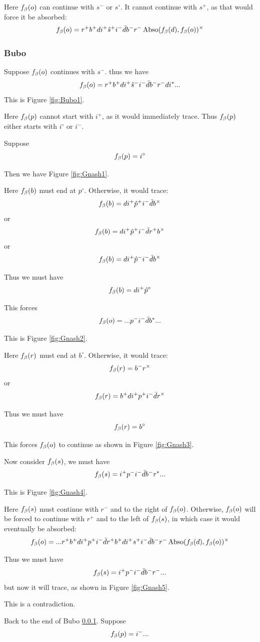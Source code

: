 Here $f_\beta(o)$ can continue with $s^-$ or $s^\circ$. It cannot continue with $s^+$, as that would force it be absorbed:
\[
f_\beta(o) = r^+ b^+ d i^+ \hat{s}^+ i^- \bar{d} b^- r^- \operatorname{Abso}(f_\beta(d), f_\beta(o))^\times
\]

\subsubsection{Bubo}\label{Bubo}
Suppose $f_\beta(o)$ continues with $s^-$. thus we have
\[
f_\beta(o) = r^+ b^+ d i^+ \hat{s}^- i^- \bar{d} b^- r^- d i^*...
\]
This is Figure \ref{fig:Bubo1}.

Here $f_\beta(p)$ cannot start with $i^+$, as it would immediately trace. Thus $f_\beta(p)$ either starts with $i^\circ$ or $i^-$.

\label{Gnash}
Suppose
\[
f_\beta(p) = i^\circ
\]

Then we have Figure \ref{fig:Gnash1}.

Here $f_\beta(b)$ must end at $p^\circ$. Otherwise, it would trace:
\[
f_\beta(b) = d i^+ \hat{p}^+ i^- \bar{d} b^\times
\]
or
\[
f_\beta(b) = d i^+ \hat{p}^+ i^- \bar{d} r^+ b^\times
\]
or
\[
f_\beta(b) = d i^+ \hat{p}^-i^- \bar{d} b^\times
\]

Thus we must have
\[
f_\beta(b) = d i^+ \hat{p}^\circ
\]

This forces
\[
f_\beta(o) = ...p^- i^- \bar{d} b^*...
\]

This is Figure \ref{fig:Gnash2}.

Here $f_\beta(r)$ must end at $b^\circ$. Otherwise, it would trace:
\[
f_\beta(r) = b^- r^\times
\]
or
\[
f_\beta(r) = b^+ d i^+ p^+ i^- \bar{d} r^\times
\]

Thus we must have
\[
f_\beta(r) = b^\circ
\]

This forces $f_\beta(o)$ to continue as shown in Figure \ref{fig:Gnash3}.

Now consider $f_\beta(s)$, we must have
\[
f_\beta(s) = i^+ p^- i^- \bar{d} b^- r^*...
\]

This is Figure \ref{fig:Gnash4}.

Here $f_\beta(s)$ must continue with $r^-$ and to the right of $f_\beta(o)$. Otherwise, $f_\beta(o)$ will be forced to continue with $r^+$ and to the left of $f_\beta(s)$, in which case it would eventually be absorbed:
\[
f_\beta(o) = ...r^+ b^+ d i^+ p^+ i^- \bar{d} r^+ b^+ d i^+ s^+ i^- \bar{d} b^- r^- \operatorname{Abso}(f_\beta(d), f_\beta(o))^\times
\]

Thus we must have 
\[
f_\beta(s) = i^+ p^- i^- \bar{d} b^- {r}^-...
\]
but now it will trace, as shown in Figure \ref{fig:Gnash5}.

This is a contradiction.

\label{Inert}
Back to the end of Bubo \ref{Bubo}. Suppose
\[
f_\beta(p) = i^-...
\]

